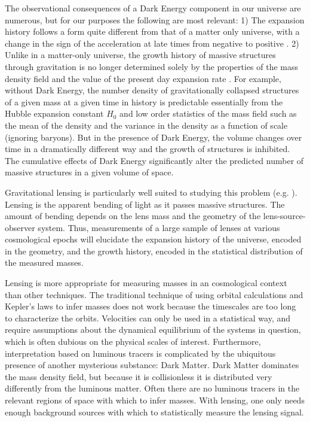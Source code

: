\documentclass[12pt]{article}
\begin{document}
The observational consequences of a Dark Energy component in our universe are
numerous, but for our purposes the following are most relevant: 1) The
expansion history follows a form quite different from that of a matter only
universe, with a change in the sign of the acceleration at late times from
negative to positive \cite{Carroll92}.  2)  Unlike in a matter-only universe,
the growth history of massive structures through gravitation is no longer
determined solely by the properties of the mass density field and the value of
the present day expansion rate \cite{Haiman01}.  For example, without Dark
Energy, the number density of gravitationally collapsed structures of a given
mass at a given time in history is predictable essentially from the Hubble
expansion constant $H_0$ and low order statistics of the mass field such as the
mean of the density and the variance in the density as a function of scale
(ignoring baryons).  But in the presence of Dark Energy, the volume changes
over time in a dramatically different way and the growth of structures is
inhibited.  The cumulative effects of Dark Energy significantly alter the
predicted number of massive structures in a given volume of space.

Gravitational lensing is particularly well suited to studying this problem
(e.g. \cite{Kaiser98,Hu04}).  Lensing is the apparent bending of light as it
passes massive structures.  The amount of bending depends on the lens mass and
the geometry of the lens-source-observer system.  Thus, measurements of a large
sample of lenses at various cosmological epochs will elucidate the expansion
history of the universe, encoded in the geometry, and the growth history,
encoded in the statistical distribution of the measured masses.  

Lensing is more appropriate for measuring masses in an cosmological context
than other techniques.  The traditional technique of using orbital calculations
and Kepler's laws to infer masses does not work because the timescales are too
long to characterize the orbits. Velocities can only be used in a statistical
way, and require assumptions about the dynamical equilibrium of the systems in
question, which is often dubious on the physical scales of interest.
Furthermore, interpretation based on luminous tracers is complicated by the
ubiquitous presence of another mysterious substance: Dark Matter.  Dark Matter
dominates the mass density field, but because it is collisionless it is
distributed very differently from the luminous matter.  Often there are no
luminous tracers in the relevant regions of space with which to infer masses.
With lensing, one only needs enough background sources with which to
statistically measure the lensing signal.
\end{document}

